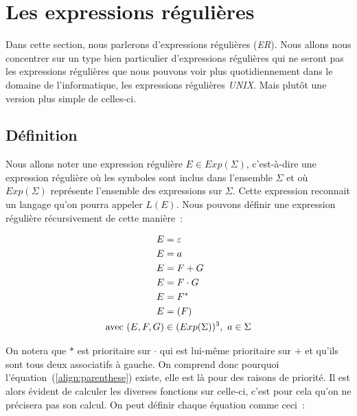 \section{Les expressions régulières}

Dans cette section, nous parlerons d'expressions régulières (\textit{ER}). Nous
allons nous concentrer sur un type bien particulier d'expressions régulières
qui ne seront pas les expressions régulières que nous pouvons voir plus
quotidiennement dans le domaine de l'informatique, les expressions régulières
\textit{UNIX}. Mais plut\^{o}t une version plus simple de celles-ci.

\subsection{Définition}

Nous allons noter une expression régulière \(E \in Exp(\Sigma)\), c'est-à-dire
une expression régulière où les symboles sont inclus dans l'ensemble \(\Sigma\)
et où \(Exp(\Sigma)\) représente l'ensemble des expressions sur \(\Sigma\).
Cette expression reconnait un langage qu'on pourra appeler \(L(E)\). Nous
pouvons définir une expression régulière récursivement de cette manière~:

\begin{align}
    E                      & = \varepsilon                             \\
    E                      & = a                                       \\
    E                      & = F + G                                   \\
    E                      & = F \cdot G                               \\
    E                      & = F^*                                     \\
    E                      & = (F)\label{align:parenthese}             \\
    \text{avec } (E, F, G) & \in (Exp(\Sigma))^3,~ a \in \Sigma \notag
\end{align}

On notera que \(*\) est prioritaire sur \(\cdot\) qui est lui-même prioritaire
sur \(+\) et qu'ils sont tous deux associatifs à gauche. On comprend donc
pourquoi l'équation~(\ref{align:parenthese}) existe, elle est là pour des
raisons de priorité. Il est alors évident de calculer les diverses fonctions
sur celle-ci, c'est pour cela qu'on ne précisera pas son
calcul\label{subsec:parenthese}. On peut définir chaque équation comme ceci~:

